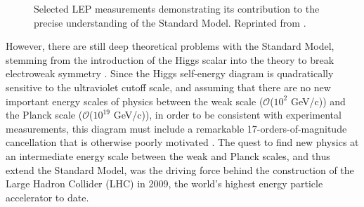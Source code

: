 \documentclass[dissertation.tex]{subfiles}
\begin{document}
\begin{figure}
	\caption{Selected LEP measurements demonstrating its contribution to the precise understanding of the Standard Model.  Reprinted from \cite{Drees}.}
	\label{fig:LEP}
\end{figure}

However, there are still deep theoretical problems with the Standard Model, stemming from the introduction of the Higgs scalar into the theory to break electroweak symmetry \cite{Higgs}.  Since the Higgs self-energy diagram is quadratically sensitive to the ultraviolet cutoff scale, and assuming that there are no new important energy scales of physics between the weak scale ($\mathcal{O}$($10^{2}$ GeV/c)) and the Planck scale ($\mathcal{O}$($10^{19}$ GeV/c)), in order to be consistent with experimental measurements, this diagram must include a remarkable 17-orders-of-magnitude cancellation that is otherwise poorly motivated \cite{Aitchison}.  The quest to find new physics at an intermediate energy scale between the weak and Planck scales, and thus extend the Standard Model, was the driving force behind the construction of the Large Hadron Collider (LHC) in 2009, the world's highest energy particle accelerator to date.
\end{document}
